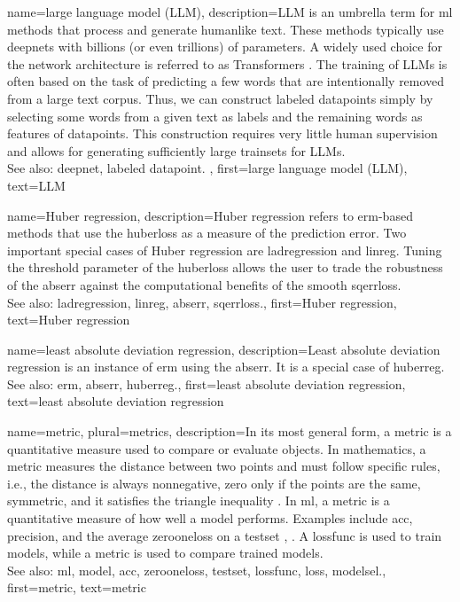 {name={large language model (LLM)},
	description={LLM is an umbrella term for \gls{ml} methods 
		that process and generate humanlike text. These methods typically 
		use \glspl{deepnet} with billions (or even trillions) of \glspl{parameter}. 
		A widely used choice for the network architecture is referred to as 
		Transformers \cite{vaswani2017attention}. The training of LLMs is often  
		based on the task of predicting a few words that are intentionally removed 
		from a large text corpus. Thus, we can construct \glspl{labeled datapoint} 
		simply by selecting some words from a given text as \glspl{label} and the remaining 
		words as \glspl{feature} of \glspl{datapoint}. This construction requires 
		very little human supervision and allows for generating sufficiently 
		large \glspl{trainset} for LLMs.
			\\
		See also: \gls{deepnet}, \gls{labeled datapoint}. },
	first={large language model (LLM)},
	text={LLM}
}


{name={Huber regression},
	description={Huber \gls{regression} refers to \gls{erm}-based methods 
		that use the \gls{huberloss} as a measure of the \gls{prediction} error. 
		Two important special cases of Huber \gls{regression} are \gls{ladregression} and 
		\gls{linreg}. Tuning the threshold \gls{parameter} of the \gls{huberloss} allows the user
		to trade the \gls{robustness} of the \gls{abserr} 
		against the computational benefits of the \gls{smooth} \gls{sqerrloss}.
					\\
		See also: \gls{ladregression}, \gls{linreg}, \gls{abserr}, \gls{sqerrloss}.},
	first={Huber regression},
	text={Huber regression}
}


{name={least absolute deviation regression},
	description={Least absolute deviation regression is 
		an instance of \gls{erm} using the \gls{abserr}. It is a special case of \gls{huberreg}.
				\\
		See also: \gls{erm}, \gls{abserr}, \gls{huberreg}.},
	first={least absolute deviation regression},
	text={least absolute deviation regression}
}

{name={metric}, plural={metrics},
	description={In its most general form, a metric is a quantitative measure used to compare or evaluate objects. 
		In mathematics, a metric measures the distance between two points and must follow specific rules, i.e., 
		the distance is always nonnegative, zero only if the points are the same, symmetric, and it satisfies the 
		triangle inequality \cite{RudinBookPrinciplesMatheAnalysis}. In \gls{ml}, a metric is a quantitative measure 
		of how well a \gls{model} performs. Examples include \gls{acc}, precision, and the average \gls{zerooneloss} 
		on a \gls{testset} \cite{Goodfellow-et-al-2016}, \cite{BishopBook}. A \gls{lossfunc} is used to train \glspl{model}, 
		while a metric is used to compare trained \glspl{model}.
		\\ 
		See also: \gls{ml}, \gls{model}, \gls{acc}, \gls{zerooneloss}, \gls{testset}, \gls{lossfunc}, \gls{loss}, \gls{modelsel}.},
	first={metric}, 
	text={metric}
}


